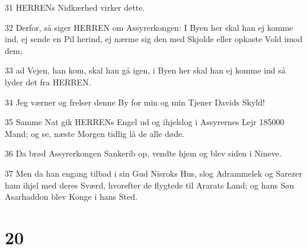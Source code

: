 \par 31 HERRENs Nidkærhed virker dette.
\par 32 Derfor, så siger HERREN om Assyrerkongen: I Byen her skal han ej komme ind, ej sende en Pil herind, ej nærme sig den med Skjolde eller opkaste Vold imod dem;
\par 33 ad Vejen, han kom, skal han gå igen, i Byen her skal han ej komme ind så lyder det fra HERREN.
\par 34 Jeg værner og frelser denne By for min og min Tjener Davids Skyld!
\par 35 Samme Nat gik HERRENs Engel ud og ihjelslog i Assyrernes Lejr 185000 Mand; og se, næste Morgen tidlig lå de alle døde.
\par 36 Da brød Assyrerkongen Sankerib op, vendte hjem og blev siden i Nineve.
\par 37 Men da han engang tilbad i sin Gud Nisroks Hus, slog Adrammelek og Sarezer ham ihjel med deres Sværd, hvorefter de flygtede til Ararats Land; og hans Søn Asarhaddon blev Konge i hans Sted.

\chapter{20}

